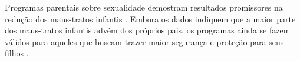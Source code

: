 










Programas parentais sobre sexualidade demostram resultados promissores na redução dos maus-tratos infantis \cite{silverman2008evidence}. Embora os dados indiquem que a maior parte dos maus-tratos infantis advém dos próprios pais, os programas ainda se fazem válidos para aqueles que buscam trazer maior segurança e proteção para seus filhos \cite{pelisoli2010prevenccao}.


  

